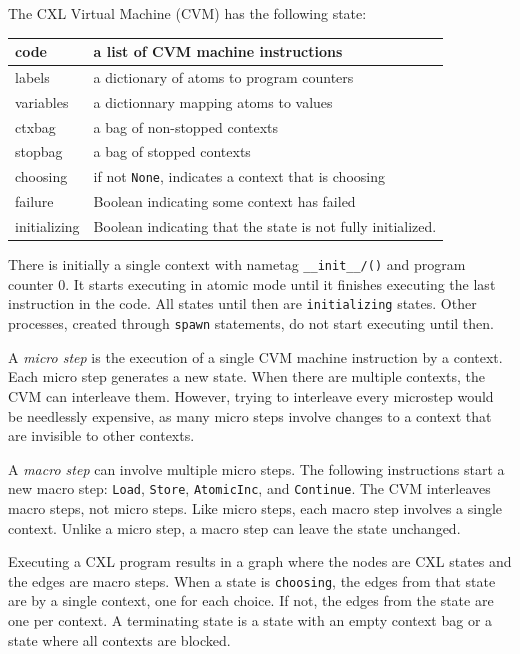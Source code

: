 \documentclass{report}
\begin{document}
The CXL Virtual Machine (CVM) has the following state:

\vspace{1em}
\begin{tabular}{|l|l|}
\hline
code & a list of CVM machine instructions \\
\hline
labels & a dictionary of atoms to program counters \\
\hline
variables & a dictionnary mapping atoms to values \\
\hline
ctxbag & a bag of non-stopped contexts \\
\hline
stopbag & a bag of stopped contexts \\
\hline
choosing & if not \texttt{None}, indicates a context that is choosing \\
\hline
failure & Boolean indicating some context has failed \\
\hline
initializing & Boolean indicating that the state is not fully initialized. \\
\hline
\end{tabular}
\vspace{1em}

There is initially a single context with nametag
\texttt{\_\_init\_\_/()} and program counter 0.  It starts executing
in atomic mode until it finishes executing the last instruction in
the code.  All states until then are \texttt{initializing} states.
Other processes, created through \texttt{spawn} statements, do not
start executing until then.

A \emph{micro step}
is the execution of a single CVM machine instruction
by a context.
Each micro step generates a new state.
When there are multiple contexts, the CVM can interleave them.
However, trying to interleave every microstep would be needlessly expensive,
as many micro steps involve changes to a context that are invisible to
other contexts.

A \emph{macro step}
can involve multiple micro steps.  The following
instructions start a new macro step: \texttt{Load}, \texttt{Store},
\texttt{AtomicInc}, and \texttt{Continue}.  The CVM
interleaves macro steps, not micro steps.  Like micro steps, each
macro step involves a single context.  Unlike a micro step, a macro
step can leave the state unchanged.

Executing a CXL program results in a graph where the nodes are CXL
states and the edges are macro steps.
When a state is \texttt{choosing}, the edges from that state are
by a single context, one for each choice.  If not, the edges from
the state are one per context.
A terminating state is a state with an empty context bag or a state
where all contexts are blocked.

\newpage
\printindex

\newpage
\printglossaries
\end{document}
